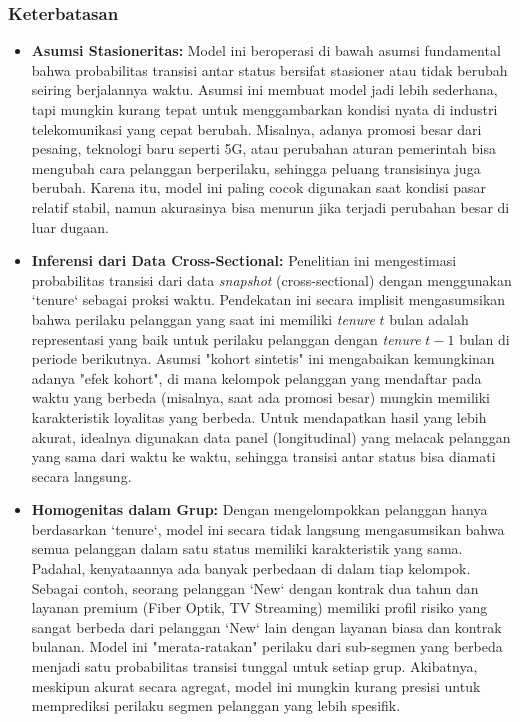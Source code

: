 \documentclass[a4paper,12pt]{article}
\begin{document}
\subsubsection{Keterbatasan}
\begin{itemize}
    \item \textbf{Asumsi Stasioneritas:} 
    Model ini beroperasi di bawah asumsi fundamental bahwa probabilitas transisi antar status bersifat stasioner atau tidak berubah seiring berjalannya waktu. Asumsi ini membuat model jadi lebih sederhana, tapi mungkin kurang tepat untuk menggambarkan kondisi nyata di industri telekomunikasi yang cepat berubah. Misalnya, adanya promosi besar dari pesaing, teknologi baru seperti 5G, atau perubahan aturan pemerintah bisa mengubah cara pelanggan berperilaku, sehingga peluang transisinya juga berubah. Karena itu, model ini paling cocok digunakan saat kondisi pasar relatif stabil, namun akurasinya bisa menurun jika terjadi perubahan besar di luar dugaan.
    \item \textbf{Inferensi dari Data Cross-Sectional:} 
    Penelitian ini mengestimasi probabilitas transisi dari data \textit{snapshot} (cross-sectional) dengan menggunakan `tenure` sebagai proksi waktu. Pendekatan ini secara implisit mengasumsikan bahwa perilaku pelanggan yang saat ini memiliki \textit{tenure} $t$ bulan adalah representasi yang baik untuk perilaku pelanggan dengan \textit{tenure} $t-1$ bulan di periode berikutnya. Asumsi "kohort sintetis" ini mengabaikan kemungkinan adanya "efek kohort", di mana kelompok pelanggan yang mendaftar pada waktu yang berbeda (misalnya, saat ada promosi besar) mungkin memiliki karakteristik loyalitas yang berbeda. Untuk mendapatkan hasil yang lebih akurat, idealnya digunakan data panel (longitudinal) yang melacak pelanggan yang sama dari waktu ke waktu, sehingga transisi antar status bisa diamati secara langsung.
    \item \textbf{Homogenitas dalam Grup:} 
    Dengan mengelompokkan pelanggan hanya berdasarkan `tenure`, model ini secara tidak langsung mengasumsikan bahwa semua pelanggan dalam satu status memiliki karakteristik yang sama. Padahal, kenyataannya ada banyak perbedaan di dalam tiap kelompok. Sebagai contoh, seorang pelanggan `New` dengan kontrak dua tahun dan layanan premium (Fiber Optik, TV Streaming) memiliki profil risiko yang sangat berbeda dari pelanggan `New` lain dengan layanan biasa dan kontrak bulanan. Model ini "merata-ratakan" perilaku dari sub-segmen yang berbeda menjadi satu probabilitas transisi tunggal untuk setiap grup. Akibatnya, meskipun akurat secara agregat, model ini mungkin kurang presisi untuk memprediksi perilaku segmen pelanggan yang lebih spesifik.
\end{itemize}
\end{document}
